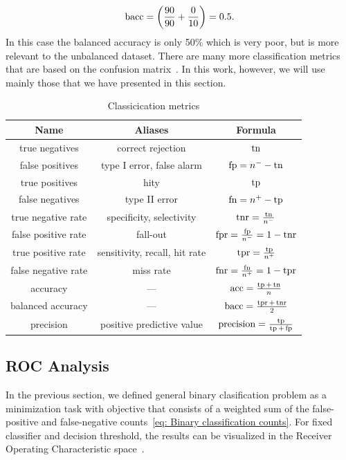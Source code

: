 \begin{equation*}
  \baccuracy = \Brac{\frac{90}{90} + \frac{0}{10}} = 0.5.
\end{equation*}
In this case the balanced accuracy is only 50\% which is very poor, but is more relevant to the unbalanced dataset. There are many more classification metrics that are based on the confusion matrix~\cite{fawcett2006introduction, metz1978basic, brodersen2010balanced, hossin2015review}. In this work, however, we will use mainly those that we have presented in this section.

\begin{table}
  \centering
  \begin{NiceTabular}{ccc}
    \toprule
    \textbf{Name} & \textbf{Aliases} & \textbf{Formula} \\
    \midrule
    true negatives & correct rejection & $\operatorname{tn}$ \\
    false positives & type I error, false alarm & $\operatorname{fp} = n^- - \operatorname{tn}$ \\
    true positives & hity & $\operatorname{tp}$ \\
    false negatives & type II error & $\operatorname{fn} = n^+ - \operatorname{tp}$ \\
    \midrule
    true negative rate & specificity, selectivity & $\operatorname{tnr} = \frac{\operatorname{tn}}{n^-}$ \\
    false positive rate & fall-out & $\operatorname{fpr} = \frac{\operatorname{fp}}{n^-} = 1 - \operatorname{tnr}$ \\
    true positive rate & sensitivity, recall, hit rate & $\operatorname{tpr} = \frac{\operatorname{tp}}{n^+}$ \\
    false negative rate & miss rate & $\operatorname{fnr} = \frac{\operatorname{fn}}{n^+} = 1 - \operatorname{tpr}$ \\
    \midrule
    accuracy & --- & $\operatorname{acc} = \frac{\operatorname{tp} + \operatorname{tn}}{n}$ \\
    balanced accuracy & --- & $\operatorname{bacc} = \frac{\operatorname{tpr} + \operatorname{tnr}}{2}$ \\
    precision & positive predictive value & $\operatorname{precision} = \frac{\operatorname{tp}}{\operatorname{tp} + \operatorname{fp}}$ \\
    \bottomrule
  \end{NiceTabular}
  \caption{Classicication metrics}
  \label{tab: classification metrics}
\end{table}

\subsection{ROC Analysis}

In the previous section, we defined general binary clasification problem as a minimization task with objective that consists of a weighted sum of the false-positive and false-negative counts~\eqref{eq: Binary classification counts}. For fixed classifier and decision threshold, the results can be visualized in the Receiver Operating Characteristic space~\cite{egan1975signal}.

